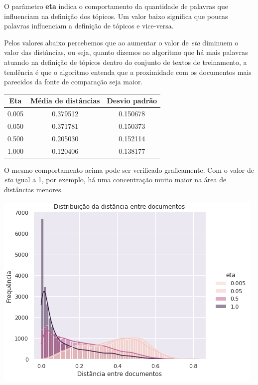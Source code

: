 O parâmetro \textbf{eta} indica o comportamento da quantidade de palavras que influenciam na definição dos tópicos. Um valor baixo significa 
que poucas palavras influenciam a definição de tópicos e vice-versa.

Pelos valores abaixo percebemos que ao aumentar o valor de \textit{eta} diminuem o valor das distâncias, ou seja, quanto dizemos ao algoritmo
que há mais palavras atuando na definição de tópicos dentro do conjunto de textos de treinamento, a tendência é que o algoritmo entenda que a 
proximidade com os documentos mais parecidos da fonte de comparação seja maior.

\begin{center}
    \begin{tabular}{|c|c|c|}
        \hline
        Eta & Média de distâncias & Desvio padrão \\ 
        \hline
        0.005 & 0.379512 & 0.150678 \\ 
        \hline
        0.050 & 0.371781 & 0.150373 \\ 
        \hline
        0.500 & 0.205030 & 0.152114 \\ 
        \hline
        1.000 & 0.120406 & 0.138177 \\ 
        \hline
    \end{tabular}
\end{center}

O mesmo comportamento acima pode ser verificado graficamente. Com o valor de \textit{eta} igual a 1, por exemplo, há uma concentração muito maior 
na área de distâncias menores.

\includegraphics[scale=0.7]{resultados/resources/distribuicao_distancias_eta.png}

